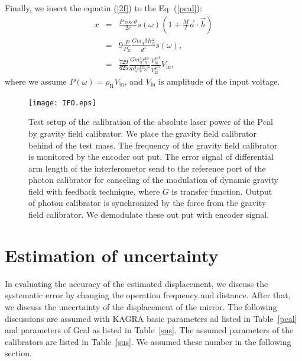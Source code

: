 \documentclass[A4]{spie}  %
\begin{document}
Finally, we insert the equatin (\ref{2f}) to the Eq. (\ref{pcal}):
\begin{eqnarray}
x&=&\frac{P \cos{\theta}}{2c} s(\omega)\left(1+\frac{M}{I}\vec{a} \cdot \vec{b} \right) \\
 &=&9\frac{P}{P_{\mathrm{2f}}}\frac{Gm_{\mathrm{q}} M r_{\mathrm{q}}^2}{d^4}s(\omega) , \\
 &=&\frac{729}{625} \frac{G m^5_{\mathrm{q}} r_{\mathrm{q}}^{10}}{m^4_{\mathrm{h}} r_{\mathrm{h}}^{12} \omega^2} \frac{{V_{\mathrm{3f}}^{R}}^4}{{V_{\mathrm{2f}}^{R}}^5}V_{\mathrm{in}} , \label{pcal_new}
\end{eqnarray}
where we assume $P(\omega)=\rho_{\mathrm{R}} V_{\mathrm{in}}$, and $V_{\mathrm{in}}$ is amplitude of the input voltage.
\begin{figure}
\begin{center}
\texttt{[image: IFO.eps]}
\caption{Test setup of the calibration of the absolute laser power of the Pcal by gravity field calibrator. We place the gravity field calibrator behind of the test mass. The frequency of the gravity field calibrator is monitored by the encoder out put. The error signal of differential arm length of the interferometor send to the reference port of the photon calibrator for canceling of the modulation of dynamic gravity field with feedback technique, where $G$ is transfer function. Output of photon calibrator is synchronized by the force from the gravity field calibrator. We demodulate these out put with encoder signal.}
\label{fig:IFO}
\end{center}
\end{figure}

\section{Estimation of uncertainty} \label{sec:EST}
In evaluating the accuracy of the estimated displacement, we discuss the systematic error by changing the operation frequency and distance. After that, we discuss the uncertainty of the displacement of the mirror. 
The following discussions are assumed with KAGRA basic parameters ad listed in Table~\ref{pcal} and parameters of Gcal as listed in Table~\ref{sus}. The assumed parameters of the calibrators are listed in Table~\ref{sus}. We assumed these number in the following section.
\end{document}
